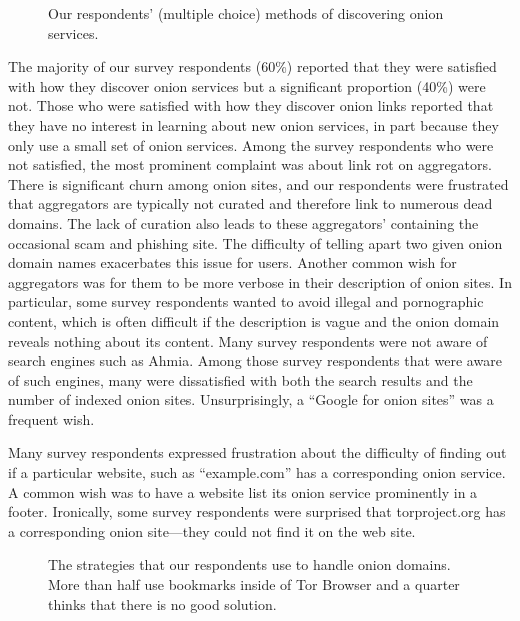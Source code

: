\begin{figure}[t]
    \centering
    
    \caption{Our respondents' (multiple choice) methods of discovering onion
    services.}
    \label{fig:onion-discovery}
\end{figure}

The majority of our survey respondents (60\%) reported that they were satisfied with how they discover onion services but a significant proportion (40\%) were not. Those who were satisfied with how they discover onion links reported that they have no
interest in learning about new onion services, in part because they only use a
small set of onion services.  Among the survey respondents who were not satisfied, the most
prominent complaint was about link rot on aggregators.  There is significant
churn among onion sites, and our respondents were frustrated that aggregators
are typically not curated and therefore link to numerous dead domains.  The lack
of curation also leads to these aggregators' containing the occasional scam and
phishing site.  The difficulty of telling apart two given onion domain names
exacerbates this issue for users.  Another common wish for aggregators was for
them to be more verbose in their description of onion sites.  In particular,
some survey respondents wanted to avoid illegal and pornographic content, which is often
difficult if the description is vague and the onion domain reveals nothing about
its content.  Many survey respondents were not aware of search engines such as Ahmia.
Among those survey respondents that were aware of such engines, many were dissatisfied with both the search results and
the number of indexed onion sites.  Unsurprisingly, a ``Google for onion sites''
was a frequent wish.

Many survey respondents expressed frustration about the difficulty of finding out if a particular website, such as 
``example.com'' has a corresponding onion service.  A common wish was to have
a website list its onion service prominently in a footer.  Ironically, some
survey respondents were surprised that torproject.org has a corresponding onion
site---they could not find it on the web site.



\begin{figure}[t]
    \centering
    
    \caption{The strategies that our respondents use to handle onion domains.
    More than half use bookmarks inside of Tor Browser and a quarter thinks that
    there is no good solution.}
    \label{fig:onion-domain-mgmt}
\end{figure}

